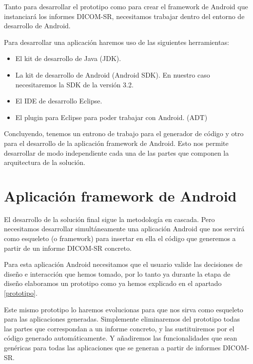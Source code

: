 Tanto para desarrollar el prototipo como para crear el framework de Android que instanciará los informes DICOM-SR, necesitamos trabajar dentro del entorno de desarrollo de Android.\par
Para desarrollar una aplicación haremos uso de las siguientes herramientas:
\begin{itemize}
\item El kit de desarrollo de Java (JDK).	
\item La kit de desarrollo de  Android (Android SDK). En nuestro caso necesitaremos la SDK de la versión 3.2.
\item El IDE de desarrollo Eclipse.
\item El plugin para Eclipse para poder trabajar con Android. (ADT)
\end{itemize}

\medskip\par
Concluyendo, tenemos un entrono de trabajo para el generador de código y otro para el desarrollo de la aplicación framework de Android. Esto nos permite desarrollar de modo independiente cada una de las partes que componen la arquitectura de la solución.


\section{Aplicación framework de Android}
El desarrollo de la solución final sigue la metodología en cascada. Pero necesitamos desarrollar simultáneamente una aplicación Android que nos servirá como esqueleto (o framework) para insertar en ella el código que generemos a partir de un informe DICOM-SR concreto.\par 
Para esta aplicación Android necesitamos que el usuario valide las decisiones de diseño e interacción que hemos tomado, por lo tanto ya durante la etapa de diseño elaboramos un prototipo como ya hemos explicado en el apartado \ref{prototipo}.\par

Este mismo prototipo lo haremos evolucionas para que nos sirva como esqueleto para las aplicaciones generadas. Simplemente eliminaremos del prototipo todas las partes que correspondan a un informe concreto, y las sustituiremos por el código generado automáticamente. Y añadiremos las funcionalidades que sean genéricas para todas las aplicaciones que se generan a partir de informes DICOM-SR. \medskip\par

